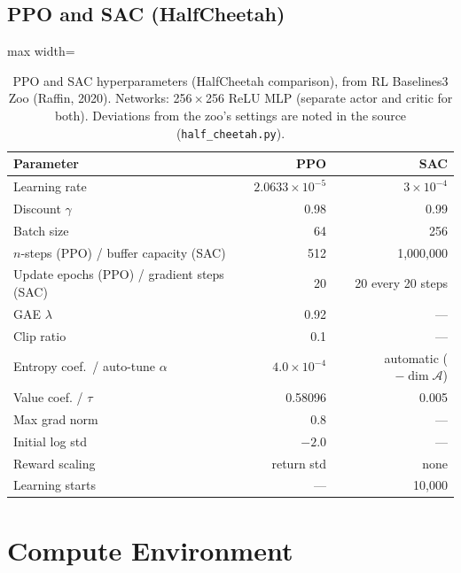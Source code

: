 \subsection*{PPO and SAC (HalfCheetah)}
\begin{table}[htbp]
\caption{PPO and SAC hyperparameters (HalfCheetah comparison), from RL Baselines3 Zoo (Raffin, 2020). Networks: 256\,$\times$\,256 ReLU MLP (separate actor and critic for both). Deviations from the zoo's settings are noted in the source (\texttt{half\_cheetah.py}).}
\begin{center}\footnotesize
\begin{adjustbox}{max width=\columnwidth}
\begin{tabular}{|l|r|r|}
\hline
\textbf{Parameter} & \textbf{PPO} & \textbf{SAC} \\
\hline
Learning rate & $2.0633\!\times\!10^{-5}$ & $3\!\times\!10^{-4}$ \\
Discount $\gamma$ & 0.98 & 0.99 \\
Batch size & 64 & 256 \\
$n$-steps (PPO) / buffer capacity (SAC) & 512 & 1,000,000 \\
Update epochs (PPO) / gradient steps (SAC) & 20 & 20 every 20 steps \\
GAE $\lambda$ & 0.92 & --- \\
Clip ratio & 0.1 & --- \\
Entropy coef.~/ auto-tune $\alpha$ & $4.0\!\times\!10^{-4}$ & automatic ($-\dim\mathcal{A}$) \\
Value coef. / $\tau$ & 0.58096 & 0.005 \\
Max grad norm & 0.8 & --- \\
Initial log std & $-2.0$ & --- \\
Reward scaling & return std & none \\
Learning starts & --- & 10,000 \\
\hline
\end{tabular}
\end{adjustbox}
\label{tab:hparams_cheetah_baselines}
\end{center}
\end{table}

\section{Compute Environment}
\label{app:compute}

